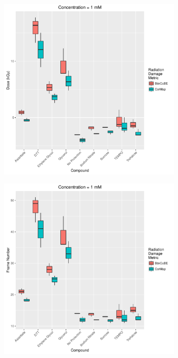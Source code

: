 \begin{figure}
    \centering
    \begin{subfigure}[b]{0.45\textwidth}
            \centering
            \includegraphics[width=\textwidth]{figures/saxs/Conc_1_dose.pdf}
            \caption{}
            \label{fig:SAXS dose- 1mM}
    \end{subfigure}
    \qquad
    \begin{subfigure}[b]{0.45\textwidth}
            \centering
            \includegraphics[width=\textwidth]{figures/saxs/Conc_1_frame_num.pdf}

\end{subfigure}
\end{figure}
